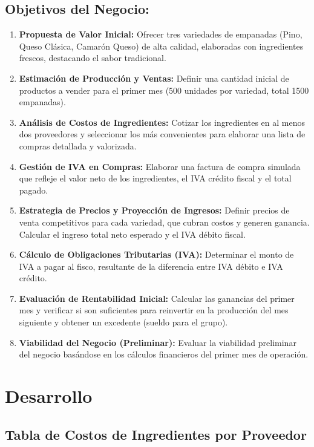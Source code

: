 \documentclass[12pt]{article}
\begin{document}
\subsection{Objetivos del Negocio:}
\begin{enumerate}
    \item \textbf{Propuesta de Valor Inicial:} Ofrecer tres variedades de empanadas (Pino, Queso Clásica, Camarón Queso) de alta calidad, elaboradas con ingredientes frescos, destacando el sabor tradicional.
    \item \textbf{Estimación de Producción y Ventas:} Definir una cantidad inicial de productos a vender para el primer mes (500 unidades por variedad, total 1500 empanadas).
    \item \textbf{Análisis de Costos de Ingredientes:} Cotizar los ingredientes en al menos dos proveedores y seleccionar los más convenientes para elaborar una lista de compras detallada y valorizada.
    \item \textbf{Gestión de IVA en Compras:} Elaborar una factura de compra simulada que refleje el valor neto de los ingredientes, el IVA crédito fiscal y el total pagado.
    \item \textbf{Estrategia de Precios y Proyección de Ingresos:} Definir precios de venta competitivos para cada variedad, que cubran costos y generen ganancia. Calcular el ingreso total neto esperado y el IVA débito fiscal.
    \item \textbf{Cálculo de Obligaciones Tributarias (IVA):} Determinar el monto de IVA a pagar al fisco, resultante de la diferencia entre IVA débito e IVA crédito.
    \item \textbf{Evaluación de Rentabilidad Inicial:} Calcular las ganancias del primer mes y verificar si son suficientes para reinvertir en la producción del mes siguiente y obtener un excedente (sueldo para el grupo).
    \item \textbf{Viabilidad del Negocio (Preliminar):} Evaluar la viabilidad preliminar del negocio basándose en los cálculos financieros del primer mes de operación.
\end{enumerate}
\newpage

\section{Desarrollo} %

\subsection{Tabla de Costos de Ingredientes por Proveedor}
\end{document}
